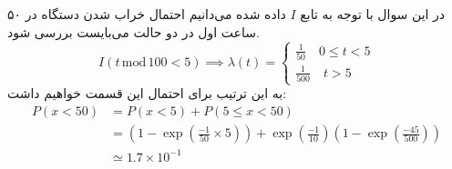 در این سوال با توجه به تابع
$I$
داده شده می‌دانیم احتمال خراب شدن دستگاه در ۵۰ ساعت اول در دو حالت می‌بایست بررسی شود.
$$ I (t \, \text{mod} \, 100 < 5) \implies \lambda(t) = 
\begin{cases}
    \frac{1}{50} \quad 0 \leq t < 5 \\[0.5cm]
    \frac{1}{500} \quad t > 5
\end{cases}
$$
به این ترتیب برای احتمال این قسمت خواهیم داشت:
\begin{align*}
    P(x < 50) &= P(x < 5) + P(5 \leq x < 50) \\ 
              &= (1 - \exp(\frac{-1}{50} \times 5)) + \exp(\frac{-1}{10})(1 - \exp(\frac{-45}{500})) \\
              &\simeq 1.7 \times 10^{-1}
\end{align*}

